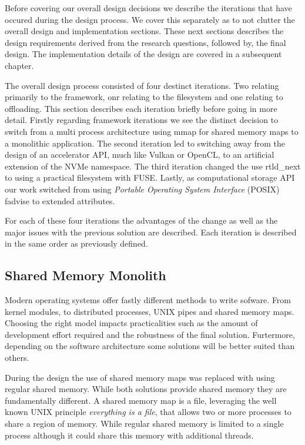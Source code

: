 Before covering our overall design decisions we describe the iterations that
have occured during the design process. We cover this separately as to not
clutter the overall design and implementation sections. These next sections
describes the design requirements derived from the research questions, followed
by, the final design. The implementation details of the design are covered in
a subsequent chapter.

The overall design process consisted of four destinct iterations. Two relating
primarily to the framework, onr relating to the filesystem and one relating to
offloading. This section describes each iteration briefly before going in more
detail. Firstly regarding framework iterations we see the distinct decision
to switch from a multi process architecture using mmap for shared memory maps to
a monolithic application. The second iteration led to switching away from the
design of an accelerator API, much like Vulkan or OpenCL, to an artificial
extension of the NVMe namespace. The third iteration changed the use
rtld\_next \cite{rtldnext} to using a practical filesystem with FUSE. Lastly, as
computational storage API our work switched from using
\textit{Portable Operating System Interface} (POSIX) fadvise \cite{fadvise} to
extended attributes.

For each of these four iterations the advantages of the change as well as the
major issues with the previous solution are described. Each iteration is
described in the same order as previously defined.

\subsection{Shared Memory Monolith}

Modern operating systems offer fastly different methods to write sofware. From
kernel modules, to distributed processes, UNIX pipes and shared memory maps.
Choosing the right model impacts practicalities such as the amount of
development effort required and the robustness of the final solution. 
Furtermore, depending on the software architecture some solutions will be better
suited than others.

During the design the use of shared memory maps was replaced with using regular
shared memory. While both solutions provide shared memory they are fundamentally
different. A shared memory map is a file, leveraging the well known UNIX
principle \textit{everything is a file}, that allows two or more processes to
share a region of memory. While regular shared memory is limited to a single
process although it could share this memory with additional threads.

